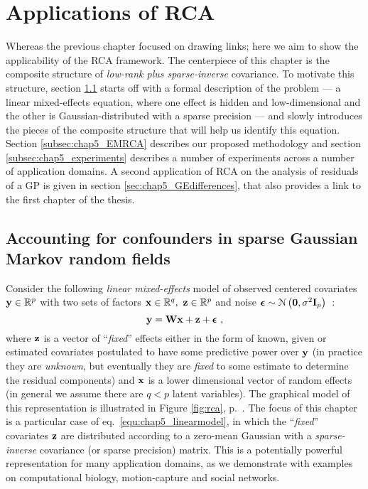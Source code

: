 \chapter[Applications of RCA]{Applications of RCA} \label{chap5:RCAapps}
\ifpdf
    \graphicspath{{Chapter5/Chapter5Figs/PNG/}{Chapter5/Chapter5Figs/PDF/}{Chapter5/Chapter5Figs/}}
\else
    \graphicspath{{Chapter5/Chapter5Figs/EPS/}{Chapter5/Chapter5Figs/}}
\fi

  Whereas the previous chapter focused on drawing links; here we aim to show the applicability of the RCA framework.
  The centerpiece of this chapter is the composite structure of \emph{low-rank plus sparse-inverse} covariance.
  To motivate this structure, section \ref{sec:chap5_confounders} starts off with a formal description of the problem --- a linear mixed-effects equation, where one effect is hidden and low-dimensional and the other is Gaussian-distributed with a sparse precision --- and slowly introduces the pieces of the composite structure that will help us identify this equation.
  Section \ref{subsec:chap5_EMRCA} describes our proposed methodology and section \ref{subsec:chap5_experiments} describes a number of experiments across a number of application domains.
  A second application of RCA on the analysis of residuals of a GP is given in section \ref{sec:chap5_GEdifferences}, that also provides a link to the first chapter of the thesis.


  \section{Accounting for confounders in sparse Gaussian Markov random fields} \label{sec:chap5_confounders}


    Consider the following \textit{linear mixed-effects} model \citep{Pinheiro:mixed2000} of observed centered covariates $\mathbf{y} \in \mathbb{R}^{p}$ with two sets of factors $\mathbf{x} \in \mathbb{R}^{q},~ \mathbf{z} \in \mathbb{R}^{p}$ and noise $\boldsymbol{\epsilon} \sim \mathcal{N} \left( \mathbf{0}, \sigma^2\mathbf{I}_p \right)$~:
    \begin{equation} \label{equ:chap5_linearmodel}
      \mathbf{y} = \mathbf{W}\mathbf{x} + \mathbf{z} + \boldsymbol{\epsilon} ~,
    \end{equation}
    where $\mathbf{z}$ is a vector of ``\textit{fixed}'' effects either in the form of known, given or estimated covariates postulated to have some predictive power over $\mathbf{y}$ (in practice they are \emph{unknown}, but eventually they are \emph{fixed} to some estimate to determine the residual components) and $\mathbf{x}$ is a lower dimensional vector of random effects (in general we assume there are $q < p$ latent variables).
    The graphical model of this representation is illustrated in Figure \ref{fig:rca}, p.~\pageref{fig:rca}.
    The focus of this chapter is a particular case of eq.~\eqref{equ:chap5_linearmodel}, in which the ``\textit{fixed}'' covariates $\mathbf{z}$ are distributed according to a zero-mean Gaussian with a \emph{sparse-inverse} covariance (or sparse precision) matrix.
    This is a potentially powerful representation for many application domains, as we demonstrate with examples on computational biology, motion-capture and social networks.

